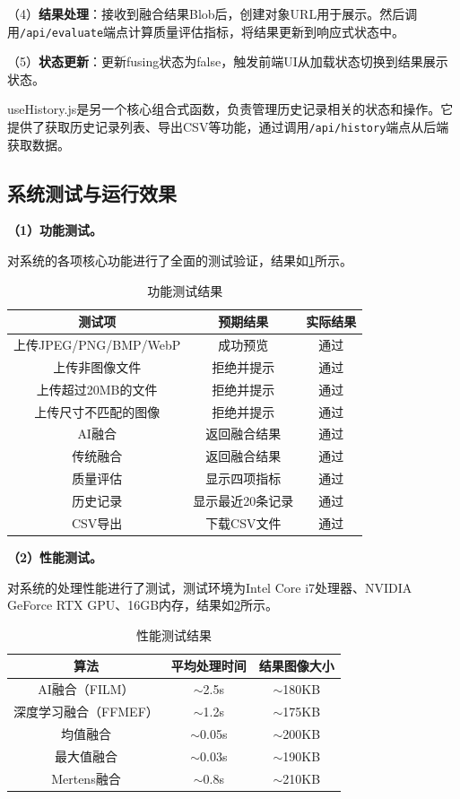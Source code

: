 （4）\textbf{结果处理}：接收到融合结果Blob后，创建对象URL用于展示。然后调用\texttt{/api/evaluate}端点计算质量评估指标，将结果更新到响应式状态中。

（5）\textbf{状态更新}：更新fusing状态为false，触发前端UI从加载状态切换到结果展示状态。

useHistory.js是另一个核心组合式函数，负责管理历史记录相关的状态和操作。它提供了获取历史记录列表、导出CSV等功能，通过调用\texttt{/api/history}端点从后端获取数据。

\subsection{系统测试与运行效果}\label{sec:testing}

\textbf{（1）功能测试。}

对系统的各项核心功能进行了全面的测试验证，结果如\cref{tab:functional_test}所示。

\begin{table}[htb!]
    \caption{功能测试结果}
    \label{tab:functional_test}
    \centering
    \begin{tabular}{ccc}
        \hline
        测试项 & 预期结果 & 实际结果 \\
        \hline
        上传JPEG/PNG/BMP/WebP & 成功预览 & 通过 \\
        上传非图像文件 & 拒绝并提示 & 通过 \\
        上传超过20MB的文件 & 拒绝并提示 & 通过 \\
        上传尺寸不匹配的图像 & 拒绝并提示 & 通过 \\
        AI融合 & 返回融合结果 & 通过 \\
        传统融合 & 返回融合结果 & 通过 \\
        质量评估 & 显示四项指标 & 通过 \\
        历史记录 & 显示最近20条记录 & 通过 \\
        CSV导出 & 下载CSV文件 & 通过 \\
        \hline
    \end{tabular}
\end{table}

\textbf{（2）性能测试。}

对系统的处理性能进行了测试，测试环境为Intel Core i7处理器、NVIDIA GeForce RTX GPU、16GB内存，结果如\cref{tab:performance}所示。

\begin{table}[htb!]
    \caption{性能测试结果}
    \label{tab:performance}
    \centering
    \begin{tabular}{ccc}
        \hline
        算法 & 平均处理时间 & 结果图像大小 \\
        \hline
        AI融合（FILM） & $\sim$2.5s & $\sim$180KB \\
        深度学习融合（FFMEF） & $\sim$1.2s & $\sim$175KB \\
        均值融合 & $\sim$0.05s & $\sim$200KB \\
        最大值融合 & $\sim$0.03s & $\sim$190KB \\
        Mertens融合 & $\sim$0.8s & $\sim$210KB \\
        \hline
    \end{tabular}
\end{table}

